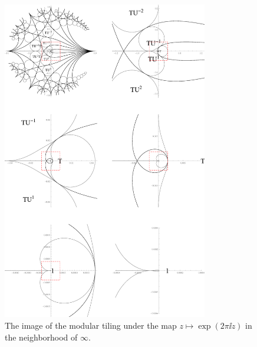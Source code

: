 \begin{figure}
\centering
\includegraphics[width=0.8\textwidth]{figures/modular-tiling-exp-zoom}
\caption{The image of the modular tiling under the map $z \mapsto \exp(2 \pi \ii z)$ in the neighborhood of $\infty$.}
\label{fig_ModularTilingExpZoom}
\end{figure}

